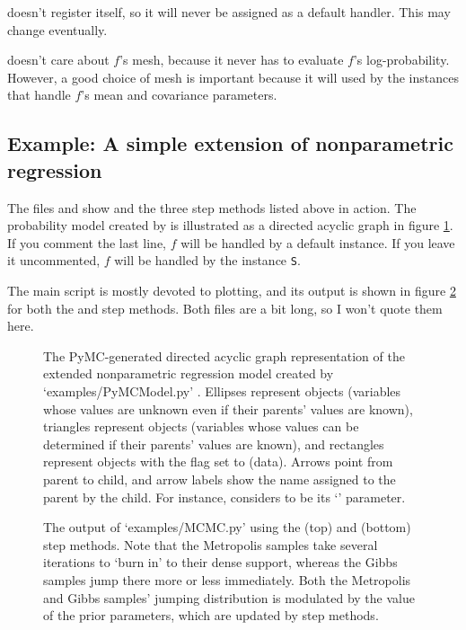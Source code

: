 \documentclass[]{manual}
\begin{document}
 doesn't register itself, so it will never be assigned as a default handler. This may change eventually.

 doesn't care about $f$'s mesh, because it never has to evaluate $f$'s log-probability. However, a good choice of mesh is important because it will used by the  instances that handle $f$'s mean and covariance parameters.

\subsection{Example: A simple extension of nonparametric regression}\label{sub:BasicMCMC}
The files  and  show  and the three step methods listed above in action. The probability model created by  is illustrated as a directed acyclic graph in figure \ref{fig:unobservedModel}. If you comment the last line, $f$ will be handled by a default  instance. If you leave it uncommented, $f$ will be handled by the  instance \texttt{S}.

The main script  is mostly devoted to plotting, and its output is shown in figure \ref{fig:MCMCOutput} for both the  and  step methods. Both files are a bit long, so I won't quote them here.
% 

\begin{figure}
    \centering
    \caption{The PyMC-generated directed acyclic graph representation of the extended nonparametric regression model created by \textsf{`examples/PyMCModel.py'} . Ellipses represent  objects (variables whose values are unknown even if their parents' values are known), triangles represent  objects (variables whose values can be determined if their parents' values are known), and rectangles represent  objects with the  flag set to  (data). Arrows point from parent to child, and arrow labels show the name assigned to the parent by the child. For instance,  considers  to be its `' parameter.}
    \label{fig:unobservedModel}
\end{figure}

\begin{figure}
    \centering
    \caption{The output of {\sffamily `examples/MCMC.py'} using the  (top) and  (bottom) step methods. Note that the Metropolis samples take several iterations to `burn in' to their dense support, whereas the Gibbs samples jump there more or less immediately. Both the Metropolis and Gibbs samples' jumping distribution is modulated by the value of the prior parameters, which are updated by  step methods.}
    \label{fig:MCMCOutput}
\end{figure}
\end{document}
